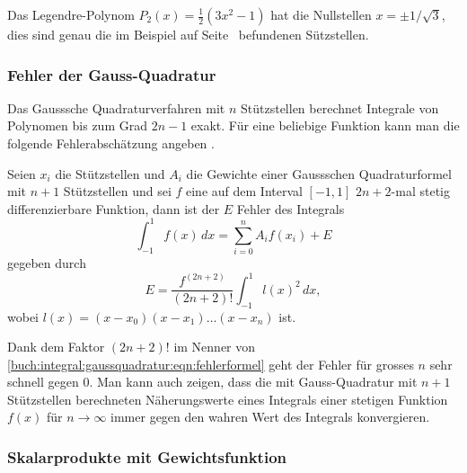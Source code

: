 \begin{beispiel}
Das Legendre-Polynom $P_2(x) = \frac12(3x^2-1)$ hat die
Nullstellen $x=\pm1/\sqrt{3}$, dies sind genau die im Beispiel
auf Seite~\pageref{buch:integral:beispiel:gaussquadraturn1} befundenen
Sützstellen.
\end{beispiel}

\subsubsection{Fehler der Gauss-Quadratur}
Das Gausssche Quadraturverfahren mit $n$ Stützstellen berechnet
Integrale von Polynomen bis zum Grad $2n-1$ exakt.
Für eine beliebige Funktion kann man die folgende Fehlerabschätzung
angeben \cite[theorem 7.3.4, p.~497]{numal}.

\begin{satz}
Seien $x_i$ die Stützstellen und $A_i$ die Gewichte einer
Gaussschen Quadraturformel mit $n+1$ Stützstellen und sei $f$
eine auf dem Interval $[-1,1]$ $2n+2$-mal stetig differenzierbare
Funktion, dann ist der $E$ Fehler des Integrals
\[
\int_{-1}^1 f(x)\,dx = \sum_{i=0}^n A_i f(x_i) + E
\]
gegeben durch
\begin{equation}
E = \frac{f^{(2n+2)}}{(2n+2)!}\int_{-1}^1 l(x)^2\,dx,
\label{buch:integral:gaussquadratur:eqn:fehlerformel}
\end{equation}
wobei $l(x)=(x-x_0)(x-x_1)\dots(x-x_n)$ ist.
\end{satz}

Dank dem Faktor $(2n+2)!$ im Nenner von
\eqref{buch:integral:gaussquadratur:eqn:fehlerformel}
geht der Fehler für grosses $n$ sehr schnell gegen $0$.
Man kann auch zeigen, dass die mit Gauss-Quadratur mit $n+1$
Stützstellen berechneten Näherungswerte eines Integrals einer
stetigen Funktion $f(x)$ für $n\to\infty$ immer gegen den wahren
Wert des Integrals konvergieren.

\subsubsection{Skalarprodukte mit Gewichtsfunktion}

